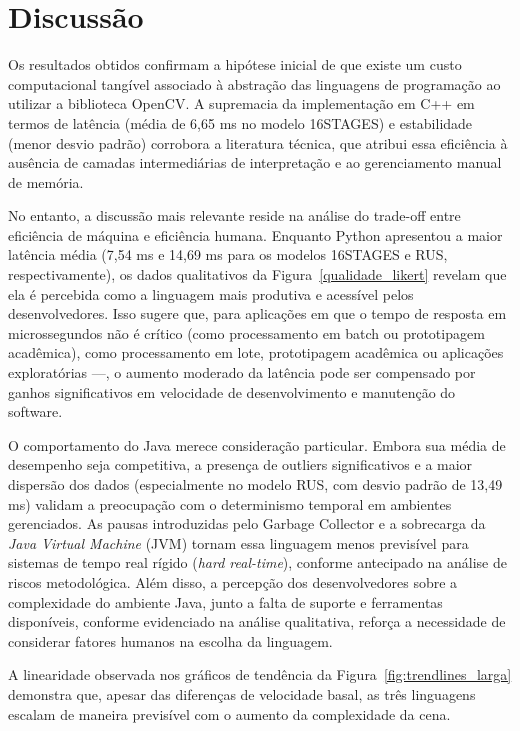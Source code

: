 
\section{Discussão}

Os resultados obtidos confirmam a hipótese inicial de que existe um custo computacional tangível associado à abstração das linguagens de programação ao utilizar a biblioteca OpenCV. A supremacia da implementação em C++ em termos de latência (média de 6,65 ms no modelo 16STAGES) e estabilidade (menor desvio padrão) corrobora a literatura técnica, que atribui essa eficiência à ausência de camadas intermediárias de interpretação e ao gerenciamento manual de memória.

No entanto, a discussão mais relevante reside na análise do trade-off entre eficiência de máquina e eficiência humana. Enquanto Python apresentou a maior latência média (7,54 ms e 14,69 ms para os modelos 16STAGES e RUS, respectivamente), os dados qualitativos da Figura~\ref{qualidade_likert} revelam que ela é percebida como a linguagem mais produtiva e acessível pelos desenvolvedores. Isso sugere que, para aplicações em que o tempo de resposta em microssegundos não é crítico (como processamento em batch ou prototipagem acadêmica), como processamento em lote, prototipagem acadêmica ou aplicações exploratórias —, o aumento moderado da latência pode ser compensado por ganhos significativos em velocidade de desenvolvimento e manutenção do software.

O comportamento do Java merece consideração particular. Embora sua média de desempenho seja competitiva, a presença de outliers significativos e a maior dispersão dos dados (especialmente no modelo RUS, com desvio padrão de 13,49 ms)  validam a preocupação com o determinismo temporal em ambientes gerenciados. As pausas introduzidas pelo Garbage Collector e a sobrecarga da \textit{Java Virtual Machine} (JVM) tornam essa linguagem menos previsível para sistemas de tempo real rígido (\textit{hard real-time}), conforme antecipado na análise de riscos metodológica. Além disso, a percepção dos desenvolvedores sobre a complexidade do ambiente Java, junto a falta de suporte e ferramentas disponíveis, conforme evidenciado na análise qualitativa, reforça a necessidade de considerar fatores humanos na escolha da linguagem.

A linearidade observada nos gráficos de tendência da Figura~\ref{fig:trendlines_larga} demonstra que, apesar das diferenças de velocidade basal, as três linguagens escalam de maneira previsível com o aumento da complexidade da cena.

